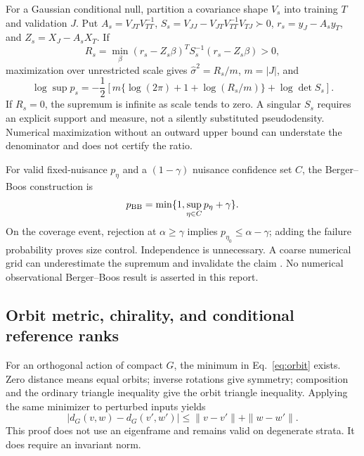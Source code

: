 For a Gaussian conditional null, partition a covariance shape $V_s$ into training $T$ and validation $J$. Put $A_s=V_{JT}V_{TT}^{-1}$, $S_s=V_{JJ}-V_{JT}V_{TT}^{-1}V_{TJ}\succ0$, $r_s=y_J-A_sy_T$, and $Z_s=X_J-A_sX_T$. If
\begin{equation}
 R_s=\min_\beta(r_s-Z_s\beta)^TS_s^{-1}(r_s-Z_s\beta)>0,
\end{equation}
maximization over unrestricted scale gives $\hat\sigma^2=R_s/m$, $m=|J|$, and
\begin{equation}
 \log\sup p_s=-\frac12\left[m\{\log(2\pi)+1+\log(R_s/m)\}+\log\det S_s\right].
\end{equation}
If $R_s=0$, the supremum is infinite as scale tends to zero. A singular $S_s$ requires an explicit support and measure, not a silently substituted pseudodensity. Numerical maximization without an outward upper bound can understate the denominator and does not certify the ratio.

For valid fixed-nuisance $p_\eta$ and a $(1-\gamma)$ nuisance confidence set $C$, the Berger--Boos construction is
\begin{equation}
 p_{\rm BB}=\min\{1,\sup_{\eta\in C}p_\eta+\gamma\}.
\end{equation}
On the coverage event, rejection at $\alpha\geq\gamma$ implies $p_{\eta_0}\leq\alpha-\gamma$; adding the failure probability proves size control. Independence is unnecessary. A coarse numerical grid can underestimate the supremum and invalidate the claim \cite{BergerBoos1994}. No numerical observational Berger--Boos result is asserted in this report.

\subsection{Orbit metric, chirality, and conditional reference ranks}
\label{app:orbits}

For an orthogonal action of compact $G$, the minimum in Eq.~\eqref{eq:orbit} exists. Zero distance means equal orbits; inverse rotations give symmetry; composition and the ordinary triangle inequality give the orbit triangle inequality. Applying the same minimizer to perturbed inputs yields
\begin{equation}
 |d_G(v,w)-d_G(v',w')|\leq\|v-v'\|+\|w-w'\|.
\end{equation}
This proof does not use an eigenframe and remains valid on degenerate strata. It does require an invariant norm.

